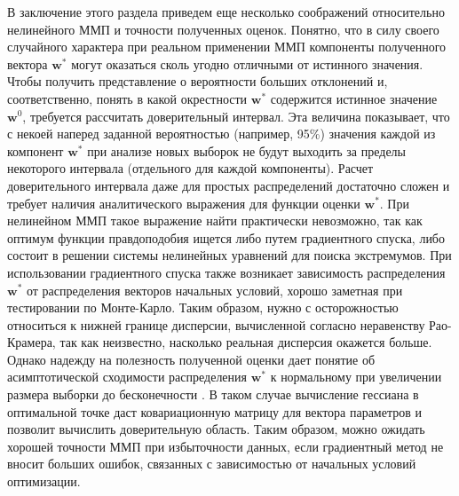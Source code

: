 \documentclass[14pt, a4paper]{extreport}
\numberwithin{equation}{section}
\begin{document}
В заключение этого раздела приведем еще несколько соображений относительно нелинейного ММП и точности полученных оценок. Понятно, что в силу своего случайного характера при реальном применении ММП компоненты полученного вектора $\mathbf{w}^*$ могут оказаться сколь угодно отличными от истинного значения. Чтобы получить представление о вероятности больших отклонений и, соответственно, понять в какой окрестности  $\mathbf{w}^*$ содержится истинное значение $\mathbf{w}^0$, требуется рассчитать доверительный интервал. Эта величина показывает, что с некоей наперед заданной вероятностью (например, 95\%) значения каждой из компонент $\mathbf{w}^*$ при анализе новых выборок не будут выходить за пределы некоторого интервала (отдельного для каждой компоненты). Расчет доверительного интервала даже для простых распределений достаточно сложен и требует наличия аналитического выражения для функции оценки $\mathbf{w}^*$. При нелинейном ММП такое выражение найти практически невозможно, так как оптимум функции правдоподобия ищется либо путем градиентного спуска, либо состоит в решении системы нелинейных уравнений для поиска экстремумов. При использовании градиентного спуска также возникает зависимость распределения $\mathbf{w}^*$ от распределения векторов начальных условий, хорошо заметная при тестировании по Монте-Карло. Таким образом, нужно с осторожностью относиться к нижней границе дисперсии, вычисленной согласно неравенству Рао-Крамера, так как неизвестно, насколько реальная дисперсия окажется больше. Однако надежду на полезность полученной оценки дает понятие об асимптотической сходимости распределения  $\mathbf{w}^*$ к нормальному при увеличении размера выборки до бесконечности \cite{jennrich1969, anastasiou2017}. В таком случае вычисление гессиана в оптимальной точке даст ковариационную матрицу для вектора параметров и позволит вычислить доверительную область. Таким образом, можно ожидать хорошей точности ММП при избыточности данных, если градиентный метод не вносит больших ошибок, связанных с зависимостью от начальных условий оптимизации.
 

\renewcommand\bibname{Список литературы}


\end{document}
